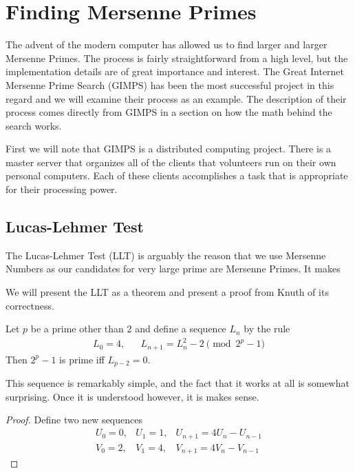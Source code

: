 \section{Finding Mersenne Primes}

The advent of the modern computer has allowed us to find larger and larger Mersenne Primes.  The process is fairly straightforward from a high level, but the implementation details are of great importance and interest. The Great Internet Mersenne Prime Search (GIMPS) has been the most successful project in this regard and we will examine their process as an example.  The description of their process comes directly from GIMPS \cite{gimps} in a section on how the math behind the search works. 

First we will note that GIMPS is a distributed computing project.  There is a master server that organizes all of the clients that volunteers run on their own personal computers.  Each of these clients accomplishes a task that is appropriate for their processing power.  %

\subsection{Lucas-Lehmer Test}

The Lucas-Lehmer Test (LLT) is arguably the reason that we use Mersenne Numbers as our candidates for very large prime are Mersenne Primes.  It makes %


We will present the LLT as a theorem and present a proof from Knuth \cite{taocp} of its correctness.

\begin{thm} 
Let $p$ be a prime other than 2 and define a sequence $L_n$ by the rule
\begin{align}
L_0 = 4,&&L_{n+1} = L_n^2 - 2 \pmod{2^p - 1}
\end{align}
Then $2^p - 1$ is prime iff $L_{p-2} = 0$.
\end{thm}

This sequence is remarkably simple, and the fact that it works at all is somewhat surprising. Once it is understood however, it is makes sense.  
\begin{proof}
Define two new sequences
\begin{align}
U_0 = 0,& U_1 = 1,& U_{n+1} = 4U_n - U_{n-1}\\ 
V_0 = 2,& V_1 = 4,& V_{n+1} = 4V_n - V_{n-1}
\end{align}
\end{proof}



